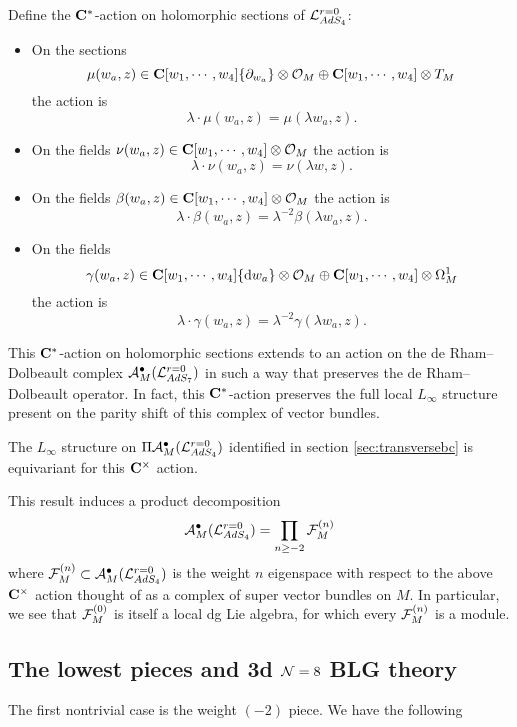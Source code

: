 \documentclass[../main.tex]{subfiles}
\begin{document}
Define the $\mathbf{C}^*$-action on holomorphic sections of $\mathcal L_{AdS_4}^{r=0}$:
\begin{itemize}
\item On the sections 
\[
\mu(w_a,z) \in \mathbf{C}[w_1, \cdots, w_4]\{\partial_{w_a}\} \otimes \mathcal O_M \oplus \mathbf{C}[w_1, \cdots, w_4]\otimes T_M \] 
the action is
\[
\lambda \cdot \mu(w_a,z) = \mu(\lambda w_a , z).
\]
\item On the fields $\nu(w_a,z) \in \mathbf{C}[w_1, \cdots, w_4] \otimes \mathcal O_M$ the action is
\[
\lambda \cdot \nu(w_a,z) = \nu(\lambda w , z).
\]
\item On the fields $\beta(w_a,z) \in  \mathbf{C}[w_1, \cdots, w_4] \otimes \mathcal O_M$ the action is
\[
\lambda \cdot \beta(w_a,z) = \lambda^{-2} \beta(\lambda w_a , z).
\]
\item On the fields 
\[
\gamma(w_a,z) \in  \mathbf{C}[w_1, \cdots, w_4] \{\mathrm{d} w_a\} \otimes \mathcal O_M \oplus  \mathbf{C}[w_1, \cdots, w_4] \otimes \Omega^1_M
\] 
the action is
\[
\lambda \cdot \gamma(w_a,z) = \lambda^{-2} \gamma(\lambda w _a, z).
\]
\end{itemize}

This $\mathbf{C}^*$-action on holomorphic sections extends to an action on the de Rham--Dolbeault complex $\mathcal A^\bullet_M(\mathcal L_{AdS_7}^{r=0})$ in such a way that preserves the de Rham--Dolbeault operator.
In fact, this $\mathbf{C}^*$-action preserves the full local $L_\infty$ structure present on the parity shift of this complex of vector bundles.

\begin{prop}\label{prop:ads4decomp}
The $L_\infty$ structure on $\Pi \mathcal A_M^\bullet(\mathcal{L}^{r=0}_{AdS_4} )$ identified in section \ref{sec:transversebc} is equivariant for this $\mathbf{C}^\times$ action.
\end{prop}

This result induces a product decomposition 
\[
 \mathcal A_M^\bullet(\mathcal{L}^{r=0}_{AdS_4} ) = \prod _{n\geq -2} \mathcal{F}^{(n)}_{M}
\]
where $\mathcal F^{(n)}_M \subset \mathcal A_M^\bullet(\mathcal{L}^{r=0}_{AdS_4} )$ is the weight $n$ eigenspace with respect to the above $\mathbf{C}^\times$ action thought of as a complex of super vector bundles on $M$. 
In particular, we see that $\mathcal{F}^{(0)}_{M}$ is itself a local dg Lie algebra, for which  every $\mathcal{F}^{(n)}_{M}$ is a module.

\subsection{The lowest pieces and 3d $\mathcal{N}=8$ BLG theory}\label{sec:BLG}
\parsec[] The first nontrivial case is the weight ${(-2)}$ piece. We have the following
\end{document}
